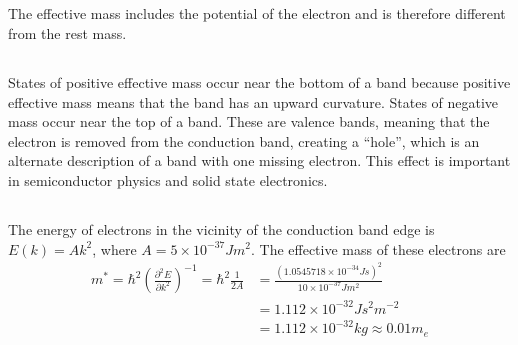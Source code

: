 \documentclass[11pt]{amsart}
\begin{document}
\subsection{}
The effective mass includes the potential of the electron and is therefore different from the rest mass.

\subsection{}
States of positive effective mass occur near the bottom of a band because positive effective mass means that the band has an upward curvature. States of negative mass occur near the top of a band. These are valence bands, meaning that the electron is removed from the conduction band, creating a ``hole'', which is an alternate description of a band with one missing electron. This effect is important in semiconductor physics and solid state electronics.

\subsection{}
The energy of electrons in the vicinity of the conduction band edge is $E(k) = Ak^2$, where $A = 5\times 10^{-37} Jm^2$. The effective mass of these electrons are
\begin{align*}
m^* = \hbar^2\left(\frac{\partial^2 E}{\partial k^2}\right)^{-1} = \hbar^2\frac{1}{2A} 
&= \frac{(1.0545718 \times 10^{-34}Js)^2}{10\times 10^{-37}Jm^2 } \\
&= 1.112\times 10^{-32} Js^2m^{-2} \\
&= 1.112\times 10^{-32} kg \approx 0.01m_e
\end{align*}
\end{document}
